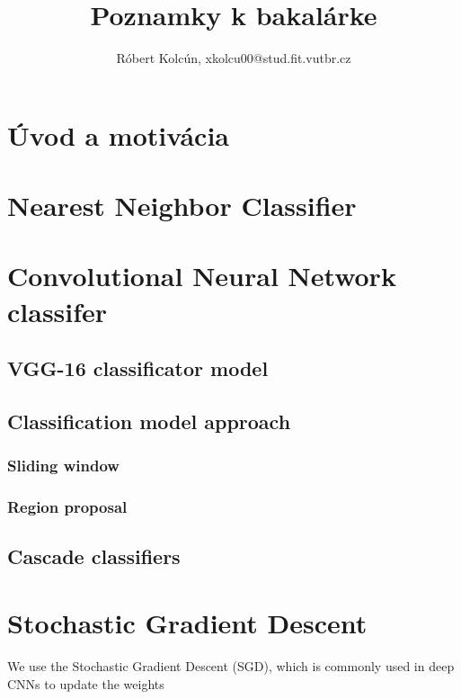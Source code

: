 \documentclass[10pt,a4paper]{article}
\begin{document}
\title{Poznamky k bakalárke}
\author{Róbert Kolcún, xkolcu00@stud.fit.vutbr.cz}
\maketitle

\section{Úvod a motivácia}

\section{Nearest Neighbor Classifier}

\section{Convolutional Neural Network classifer}


\subsection{VGG-16 classificator model}


\subsection{Classification model approach}

\subsubsection{Sliding window}


\subsubsection{Region proposal}


\subsection{Cascade classifiers}


\section{Stochastic Gradient Descent}
We use the Stochastic Gradient Descent (SGD),
which is commonly used in deep CNNs to update the weights
\end{document}
